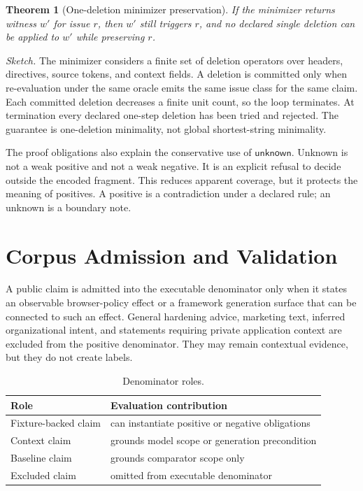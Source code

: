 \documentclass[10pt,conference]{IEEEtran}
\newtheorem{theorem}{Theorem}
\newcommand{\unknown}{\ensuremath{\mathsf{unknown}}}
\begin{document}
\begin{theorem}[One-deletion minimizer preservation]
If the minimizer returns witness $w'$ for issue $r$, then $w'$ still triggers $r$, and no declared single deletion can be applied to $w'$ while preserving $r$.
\end{theorem}
\emph{Sketch.} The minimizer considers a finite set of deletion operators over headers, directives, source tokens, and context fields. A deletion is committed only when re-evaluation under the same oracle emits the same issue class for the same claim. Each committed deletion decreases a finite unit count, so the loop terminates. At termination every declared one-step deletion has been tried and rejected. The guarantee is one-deletion minimality, not global shortest-string minimality.

The proof obligations also explain the conservative use of \unknown{}. Unknown is not a weak positive and not a weak negative. It is an explicit refusal to decide outside the encoded fragment. This reduces apparent coverage, but it protects the meaning of positives. A positive is a contradiction under a declared rule; an unknown is a boundary note.

\section{Corpus Admission and Validation}

A public claim is admitted into the executable denominator only when it states an observable browser-policy effect or a framework generation surface that can be connected to such an effect. General hardening advice, marketing text, inferred organizational intent, and statements requiring private application context are excluded from the positive denominator. They may remain contextual evidence, but they do not create labels.

\begin{table}[t]
\centering
\caption{Denominator roles.}
\label{tab:supp-roles}
\begin{tabular}{p{}p{}}
\toprule
Role & Evaluation contribution \\
\midrule
Fixture-backed claim & can instantiate positive or negative obligations \\
Context claim & grounds model scope or generation precondition \\
Baseline claim & grounds comparator scope only \\
Excluded claim & omitted from executable denominator \\
\bottomrule
\end{tabular}
\end{table}
\end{document}
